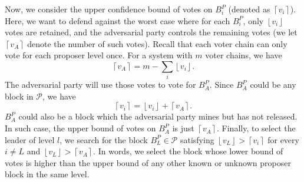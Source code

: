Now, we consider the upper confidence bound of votes on $B_i^P$ (denoted as $\left \lceil v_{i} \right \rceil$). Here, we want to defend against the worst case where for each $B_i^P$, only $\left \lfloor v_{i} \right \rfloor$ votes are retained, and the adversarial party controls the remaining votes (we let $\left \lceil v_A \right \rceil$ denote the number of such votes). Recall that each voter chain can only vote for each proposer level once. For a system with $m$ voter chains, we have
$$\left \lceil v_A \right \rceil = m - \sum_{i}\left \lfloor v_{i} \right \rfloor.$$
The adversarial party will use those votes to vote for $B^P_A$. Since $B^P_A$ could be any block in $\mathcal P$, we have
$$\left \lceil v_i \right \rceil = \left \lfloor v_{i} \right \rfloor + \left \lceil v_A \right \rceil.$$
$B^P_A$ could also be a block which the adversarial party mines but has not released. In such case, the upper bound of votes on $B^P_A$ is just $\left \lceil v_A \right \rceil$. Finally, to select the leader of level $l$, we search for the block $B^P_L \in \mathcal P$ satisfying $\left \lfloor v_{L} \right \rfloor > \left \lceil v_i \right \rceil$ for every $i \neq L$ and $\left \lfloor v_{L} \right \rfloor > \left \lceil v_A \right \rceil$. In words, we select the block whose lower bound of votes is higher than the upper bound of any other known or unknown proposer block in the same level.